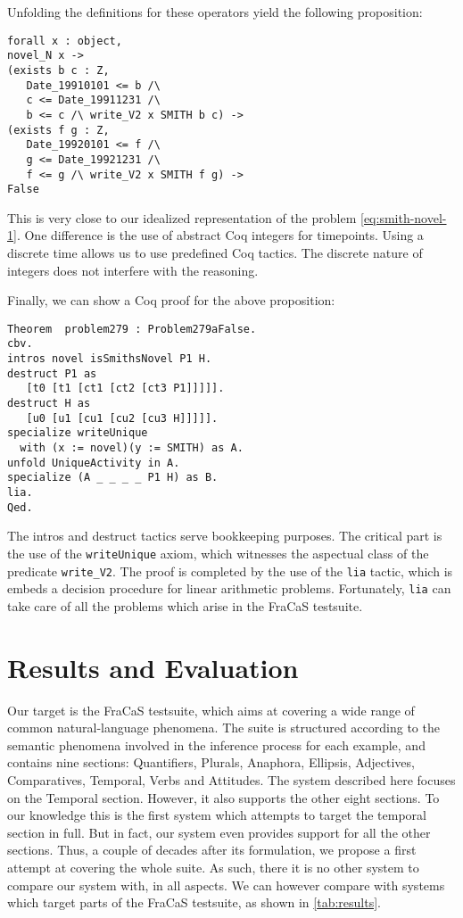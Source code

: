 \documentclass[a4paper,twoside]{article}
\begin{document}
Unfolding the definitions for these operators yield the following
proposition:
{\small
\begin{verbatim}
forall x : object,
novel_N x ->
(exists b c : Z,
   Date_19910101 <= b /\
   c <= Date_19911231 /\
   b <= c /\ write_V2 x SMITH b c) ->
(exists f g : Z,
   Date_19920101 <= f /\
   g <= Date_19921231 /\
   f <= g /\ write_V2 x SMITH f g) ->
False
\end{verbatim}
}This is very close to our idealized representation of the problem
\cref{eq:smith-novel-1}. One difference is the use of abstract Coq
integers for timepoints. Using a discrete time allows us to use
predefined Coq tactics. The discrete nature of integers does not
interfere with the reasoning.

Finally, we can show a Coq proof for the above proposition:
{\small
\begin{verbatim}
Theorem  problem279 : Problem279aFalse.
cbv.
intros novel isSmithsNovel P1 H.
destruct P1 as
   [t0 [t1 [ct1 [ct2 [ct3 P1]]]]].
destruct H as
   [u0 [u1 [cu1 [cu2 [cu3 H]]]]].
specialize writeUnique
  with (x := novel)(y := SMITH) as A.
unfold UniqueActivity in A.
specialize (A _ _ _ _ P1 H) as B.
lia.
Qed.
\end{verbatim}
}

The intros and destruct tactics serve bookkeeping purposes. The
critical part is the use of the \texttt{writeUnique} axiom, which
witnesses the aspectual class of the predicate \texttt{write\_V2}.
The proof is completed by the use of the \texttt{lia} tactic, which is
embeds a decision procedure for linear arithmetic
problems. Fortunately, \texttt{lia} can take care of all the problems
which arise in the FraCaS testsuite.

\section{Results and Evaluation}
\label{sec:results}
Our target is the FraCaS testsuite, which aims at covering a wide
range of common natural-language phenomena. 
%
The suite is structured according to the semantic phenomena involved
in the inference process for each example, and contains nine sections:
Quantifiers, Plurals, Anaphora, Ellipsis, Adjectives, Comparatives,
Temporal, Verbs and Attitudes.  The system described here focuses on
the Temporal section. However, it also supports the other eight
sections.  To our knowledge this is the first system which attempts to
target the temporal section in full. But in fact, our system even provides
support for all the other sections. Thus, a couple of decades after its
formulation, we propose a first attempt at covering the whole suite.
As such, there it is no other system to compare our system with, in
all aspects.  We can however compare with systems which target parts
of the FraCaS testsuite, as shown in \cref{tab:results}.
\end{document}
